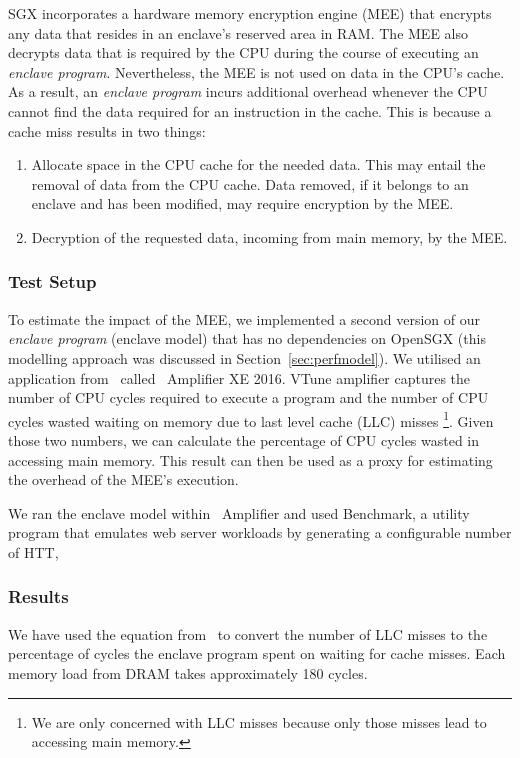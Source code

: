 \documentclass[../../../main.tex]{subfiles}
\begin{document}
SGX incorporates a hardware memory encryption engine (MEE) that
encrypts any data that resides in an enclave's reserved area in RAM.
The MEE also decrypts data that is required by the CPU during the
course of executing an \textit{enclave program}. Nevertheless, the MEE
is not used on data in the CPU's cache. As a result, an
\textit{enclave program} incurs additional overhead whenever the CPU
cannot find the data required for an instruction in the cache. This is because
a cache miss results in two things:
\begin{enumerate}
  \item Allocate space in the CPU cache for the needed data. This may entail
    the removal of data from the CPU cache. Data removed, if it belongs
    to an enclave and has been modified, may require encryption by the MEE.
  \item Decryption of the requested data, incoming from main memory, by the MEE.
\end{enumerate}

\subsubsection*{Test Setup}
To estimate the impact of the MEE, we implemented a second version of
our \textit{enclave program} (enclave model) that has no dependencies on OpenSGX (this
modelling approach was discussed in Section~\ref{sec:perfmodel}). We
utilised an application from \Intel~called
\VTune~Amplifier XE 2016. VTune
amplifier captures the number of CPU cycles required to execute a
program and the number of CPU cycles wasted waiting on memory due to
last level cache (LLC) misses \footnote{We are only concerned with LLC misses
  because only those misses lead to accessing main memory.}. Given those
two numbers, we can calculate the percentage of CPU cycles wasted in accessing
main memory. This result can then be used as a proxy for estimating the overhead
of the MEE's execution.

We ran the enclave model within \VTune~Amplifier and used \Apache
Benchmark, a utility program that emulates web server workloads by
generating a configurable number of HTT,

\subsubsection*{Results}

We have used the equation from \Intel~to convert the number of LLC misses to
the percentage of cycles the enclave program spent on waiting for
cache misses. Each memory load from DRAM takes approximately 180
cycles.
\end{document}
